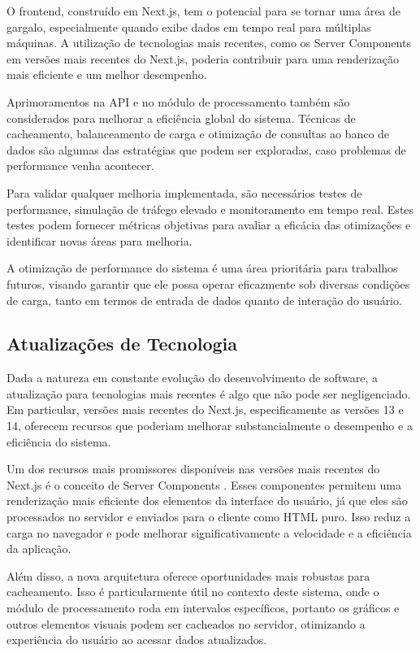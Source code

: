 O frontend, construído em Next.js, tem o potencial para se tornar uma área de gargalo, especialmente quando exibe dados em tempo real para múltiplas máquinas. A utilização de tecnologias mais recentes, como os Server Components em versões mais recentes do Next.js, poderia contribuir para uma renderização mais eficiente e um melhor desempenho.

Aprimoramentos na \gls{API} e no módulo de processamento também são considerados para melhorar a eficiência global do sistema. Técnicas de cacheamento, balanceamento de carga e otimização de consultas ao banco de dados são algumas das estratégias que podem ser exploradas, caso problemas de performance venha acontecer.

Para validar qualquer melhoria implementada, são necessários testes de performance, simulação de tráfego elevado e monitoramento em tempo real. Estes testes podem fornecer métricas objetivas para avaliar a eficácia das otimizações e identificar novas áreas para melhoria.

A otimização de performance do sistema é uma área prioritária para trabalhos futuros, visando garantir que ele possa operar eficazmente sob diversas condições de carga, tanto em termos de entrada de dados quanto de interação do usuário.

\subsection{Atualizações de Tecnologia}
Dada a natureza em constante evolução do desenvolvimento de software, a atualização para tecnologias mais recentes é algo que não pode ser negligenciado. Em particular, versões mais recentes do Next.js, especificamente as versões 13 e 14, oferecem recursos que poderiam melhorar substancialmente o desempenho e a eficiência do sistema.

Um dos recursos mais promissores disponíveis nas versões mais recentes do Next.js é o conceito de Server Components \cite{nextjsServerComponents}. Esses componentes permitem uma renderização mais eficiente dos elementos da interface do usuário, já que eles são processados no servidor e enviados para o cliente como HTML puro. Isso reduz a carga no navegador e pode melhorar significativamente a velocidade e a eficiência da aplicação.

Além disso, a nova arquitetura oferece oportunidades mais robustas para cacheamento. Isso é particularmente útil no contexto deste sistema, onde o módulo de processamento roda em intervalos específicos, portanto os gráficos e outros elementos visuais podem ser cacheados no servidor, otimizando a experiência do usuário ao acessar dados atualizados.

